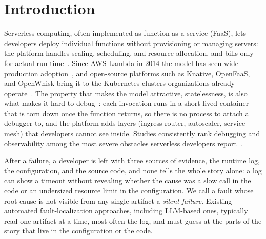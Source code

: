 \documentclass[runningheads]{llncs}
\begin{document}
\section{Introduction}

Serverless computing, often implemented as function-as-a-service (FaaS), lets developers deploy individual functions without provisioning or managing servers: the platform handles scaling, scheduling, and resource allocation, and bills only for actual run time~\cite{castro2019rise,baldini2017serverless}. Since AWS Lambda in 2014 the model has seen wide production adoption~\cite{shahrad2020serverless}, and open-source platforms such as Knative, OpenFaaS, and OpenWhisk bring it to the Kubernetes clusters organizations already operate~\cite{eismann2022state}. The property that makes the model attractive, statelessness, is also what makes it hard to debug~\cite{hellerstein2019serverless,jangda2019formal}: each invocation runs in a short-lived container that is torn down once the function returns, so there is no process to attach a debugger to, and the platform adds layers (ingress router, autoscaler, service mesh) that developers cannot see inside. Studies consistently rank debugging and observability among the most severe obstacles serverless developers report~\cite{wen2021empirical,eismann2022state}.

After a failure, a developer is left with three sources of evidence, the runtime log, the configuration, and the source code, and none tells the whole story alone: a log can show a timeout without revealing whether the cause was a slow call in the code or an undersized resource limit in the configuration. We call a fault whose root cause is not visible from any single artifact a \emph{silent failure}. Existing automated fault-localization approaches, including LLM-based ones, typically read one artifact at a time, most often the log, and must guess at the parts of the story that live in the configuration or the code.
\end{document}

